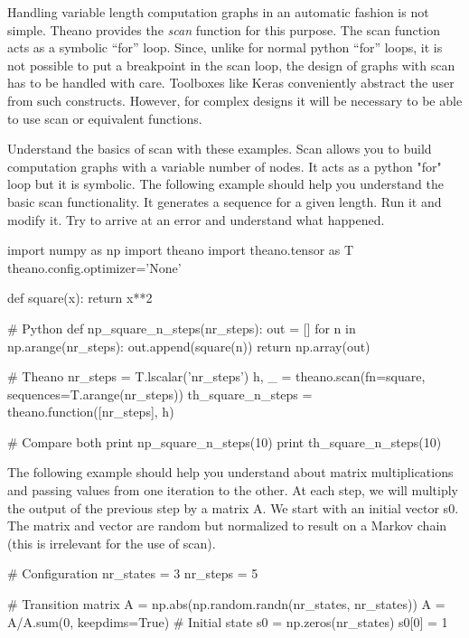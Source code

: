 Handling variable length computation graphs in an automatic fashion is not simple. 
Theano provides the \textit{scan} function for this purpose. The scan function acts
as a symbolic ``for'' loop. Since, unlike for normal python ``for'' loops, it is not
possible to put a breakpoint in the scan loop, the design of graphs
with scan has to be handled with care. Toolboxes like Keras conveniently abstract
the user from such constructs. However, for complex designs it will be
necessary to be able to use scan or equivalent functions. 

\begin{exercise}
\label{exercise:Ex2}
Understand the basics of scan with these examples. Scan allows you to build
computation graphs with a variable number of nodes. It acts as a python "for"
loop but it is symbolic. The following example should help you understand the
basic scan functionality. It generates a sequence for a given length. Run it
and modify it. Try to arrive at an error and understand what happened.
\begin{python}
import numpy as np
import theano
import theano.tensor as T
theano.config.optimizer='None'

def square(x): 
    return x**2 

# Python
def np_square_n_steps(nr_steps):
    out = []
    for n in np.arange(nr_steps):
        out.append(square(n))
    return np.array(out)


\end{python}
\begin{python}
# Theano
nr_steps = T.lscalar('nr_steps')
h, _ = theano.scan(fn=square, sequences=T.arange(nr_steps))
th_square_n_steps = theano.function([nr_steps], h)

# Compare both
print np_square_n_steps(10)
print th_square_n_steps(10)
\end{python}
The following example should help you understand about matrix multiplications
and passing values from one iteration to the other. At each step, we will
multiply the output of the previous step by a matrix A. We start with an
initial vector s0. The matrix and vector are random but normalized to result on
a Markov chain (this is irrelevant for the use of scan).  
\begin{python}
# Configuration
nr_states = 3
nr_steps = 5

# Transition matrix
A = np.abs(np.random.randn(nr_states, nr_states))
A = A/A.sum(0, keepdims=True)
# Initial state
s0 = np.zeros(nr_states)
s0[0] = 1
\end{python}



\end{exercise}
